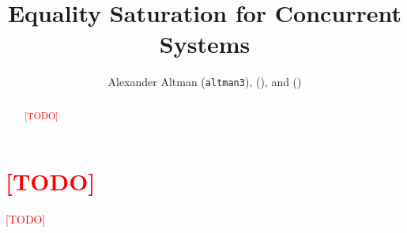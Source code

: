\documentclass[american,extrafontsizes,12pt,portrait,letterpaper,oneside,onecolumn,article,final,fleqn]{memoir}
\author{Alexander Altman (\texttt{altman3}), \TODO (\texttt{\TODO}), and \TODO (\texttt{\TODO})}
\title{Equality Saturation for Concurrent Systems}
\date{}
\newcommand*\TODO{\textcolor{red}{[TODO]}\xspace}
\begin{document}
\checkandfixthelayout[nearest]
\midsloppy

\maketitle

\begin{abstract}
\TODO
\end{abstract}

\chapter{\TODO}

\TODO
\end{document}
